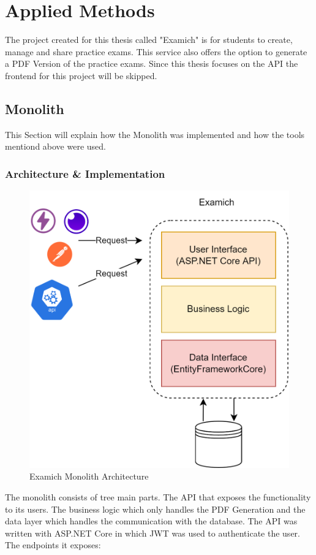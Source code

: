 \documentclass[BIF,Bachelor,nenglish]{twbook}%
\begin{document}
\clearpage
\chapter{Applied Methods}
The project created for this thesis called "Examich" is for students to create, manage and share practice exams. This service also offers the option to generate a PDF Version of the practice exams. Since this thesis focuses on the API the frontend for this project will be skipped.

\section{Monolith}
This Section will explain how the Monolith was implemented and how the tools mentiond above were used.

\subsection{Architecture \& Implementation}

\begin{figure} [H]
 \begin{center}
    \includegraphics[width=0.6\linewidth]{img/ExamichMonolith.png}
 \end{center}
 \caption{Examich Monolith Architecture}
 \label{examichMonolith}
\end{figure}

The monolith consists of tree main parts. The API that exposes the functionality to its users. The business logic which only handles the PDF Generation and the data layer which handles the communication with the database. The API was written with ASP.NET Core in which JWT was used to authenticate the user.
\\
\noindent
The endpoints it exposes:
\end{document}
